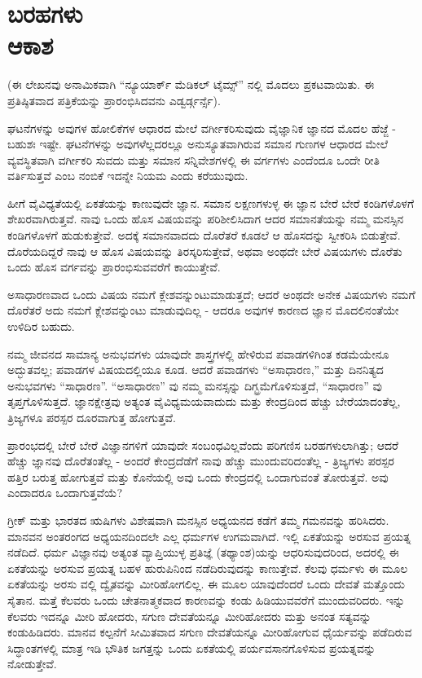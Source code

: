 
\chapter{ಬರಹಗಳು\\ಆಕಾಶ}

(ಈ ಲೇಖನವು ಅನಾಮಿಕವಾಗಿ “ನ್ಯೂಯಾರ್ಕ್ ಮೆಡಿಕಲ್ ಟೈಮ್ಸ್” ನಲ್ಲಿ ಮೊದಲು ಪ್ರಕಟವಾಯಿತು. ಈ ಪ್ರತಿಷ್ಠಿತವಾದ ಪತ್ರಿಕೆಯನ್ನು ಪ್ರಾರಂಭಿಸಿದವನು ಎಡ್ವರ್ಡ್ಗರ್ನ್ಸೆ).

ಘಟನೆಗಳನ್ನು ಅವುಗಳ ಹೋಲಿಕೆಗಳ ಆಧಾರದ ಮೇಲೆ ವರ್ಗೀಕರಿಸುವುದು ವೈಜ್ಞಾನಿಕ ಜ್ಞಾನದ ಮೊದಲ ಹೆಜ್ಜೆ - ಬಹುಶಃ ಇಷ್ಟೇ. ಘಟನೆಗಳನ್ನು ಅವುಗಳೆಲ್ಲದರಲ್ಲೂ ಅನುಸ್ಯೂತವಾಗಿರುವ ಸಮಾನ ಗುಣಗಳ ಆಧಾರದ ಮೇಲೆ ವ್ಯವಸ್ಥಿತವಾಗಿ ವರ್ಗೀಕರಿ ಸುವದು ಮತ್ತು ಸಮಾನ ಸನ್ನಿವೇಶಗಳಲ್ಲಿ ಈ ವರ್ಗಗಳು ಎಂದೆಂದೂ ಒಂದೇ ರೀತಿ ವರ್ತಿಸುತ್ತವೆ ಎಂಬ ನಂಬಿಕೆ ಇದನ್ನೇ ನಿಯಮ ಎಂದು ಕರೆಯುವುದು.

ಹೀಗೆ ವೈವಿಧ್ಯತೆಯಲ್ಲಿ ಏಕತೆಯನ್ನು ಕಾಣುವುದೇ ಜ್ಞಾನ. ಸಮಾನ ಲಕ್ಷಣಗಳುಳ್ಳ ಈ ಜ್ಞಾನ ಬೇರೆ ಬೇರೆ ಕಂಡಿಗಳೊಳಗೆ ಶೇಖರವಾಗಿರುತ್ತವೆ. ನಾವು ಒಂದು ಹೊಸ ವಿಷಯವನ್ನು ಪರಿಶೀಲಿಸಿದಾಗ ಆದರ ಸಮಾನತೆಯನ್ನು ನಮ್ಮ ಮನಸ್ಸಿನ ಕಂಡಿಗಳೊಳಗೆ ಹುಡುಕುತ್ತೇವೆ. ಅದಕ್ಕೆ ಸಮಾನವಾದದು ದೊರೆತರೆ ಕೂಡಲೆ ಆ ಹೊಸದನ್ನು ಸ್ವೀಕರಿಸಿ ಬಿಡುತ್ತೇವೆ. ದೊರೆಯದಿದ್ದರೆ ನಾವು ಆ ಹೊಸ ವಿಷಯವನ್ನು ತಿರಸ್ಕರಿಸುತ್ತೇವೆ, ಅಥವಾ ಅಂಥದೇ ಬೇರೆ ವಿಷಯಗಳು ದೊರೆತು ಒಂದು ಹೊಸ ವರ್ಗವನ್ನು ಪ್ರಾರಂಭಿಸುವವರೆಗೆ ಕಾಯುತ್ತೇವೆ.

ಅಸಾಧಾರಣವಾದ ಒಂದು ವಿಷಯ ನಮಗೆ ಕ್ಲೇಶವನ್ನುಂಟುಮಾಡುತ್ತದೆ; ಆದರೆ ಅಂಥದೇ ಅನೇಕ ವಿಷಯಗಳು ನಮಗೆ ದೊರೆತರೆ ಅದು ನಮಗೆ ಕ್ಲೇಶವನ್ನುಂಟು ಮಾಡುವುದಿಲ್ಲ - ಆದರೂ ಅವುಗಳ ಕಾರಣದ ಜ್ಞಾನ ಮೊದಲಿನಂತೆಯೇ ಉಳಿದಿರ ಬಹುದು.

ನಮ್ಮ ಜೀವನದ ಸಾಮಾನ್ಯ ಅನುಭವಗಳು ಯಾವುದೇ ಶಾಸ್ತ್ರಗಳಲ್ಲಿ ಹೇಳಿರುವ ಪವಾಡಗಳಿಗಿಂತ ಕಡಮೆಯೇನೂ ಅದ್ಭುತವಲ್ಲ; ಪವಾಡಗಳ ವಿಷಯದಲ್ಲಿಯೂ ಕೂಡ. ಆದರೆ ಪವಾಡಗಳು “ಅಸಾಧಾರಣ,” ಮತ್ತು ದಿನನಿತ್ಯದ ಅನುಭವಗಳು “ಸಾಧಾರಣ”. “ಅಸಾಧಾರಣ” ವು ನಮ್ಮ ಮನಸ್ಸನ್ನು ದಿಗ್ಭ್ರಮೆಗೊಳಿಸುತ್ತದೆ, “ಸಾಧಾರಣ” ವು ತೃಪ್ತಗೊಳಿಸುತ್ತದೆ. ಜ್ಞಾನಕ್ಷೇತ್ರವು ಅತ್ಯಂತ ವೈವಿಧ್ಯಮಯವಾದುದು ಮತ್ತು ಕೇಂದ್ರದಿಂದ ಹೆಚ್ಚು ಬೇರೆಯಾದಂತೆಲ್ಲ, ತ್ರಿಜ್ಯಗಳೂ ಪರಸ್ಪರ ದೂರವಾಗುತ್ತ ಹೋಗುತ್ತವೆ.

ಪ್ರಾರಂಭದಲ್ಲಿ ಬೇರೆ ಬೇರೆ ವಿಜ್ಞಾನಗಳಿಗೆ ಯಾವುದೇ ಸಂಬಂಧವಿಲ್ಲವೆಂದು ಪರಿಗಣಿಸ ಬರಹಗಳುಲಾಗಿತ್ತು; ಆದರೆ ಹೆಚ್ಚು ಜ್ಞಾನವು ದೊರೆತಂತೆಲ್ಲ - ಅಂದರೆ ಕೇಂದ್ರದೆಡೆಗೆ ನಾವು ಹೆಚ್ಚು ಮುಂದುವರಿದಂತೆಲ್ಲ - ತ್ರಿಜ್ಯಗಳು ಪರಸ್ಪರ ಹತ್ತಿರ ಬರುತ್ತ ಹೋಗುತ್ತವೆ ಮತ್ತು ಕೊನೆಯಲ್ಲಿ ಅವು ಒಂದು ಕೇಂದ್ರದಲ್ಲಿ ಒಂದಾಗುವಂತೆ ತೋರುತ್ತವೆ. ಅವು ಎಂದಾದರೂ ಒಂದಾಗುತ್ತವೆಯೆ?

ಗ್ರೀಕ್ ಮತ್ತು ಭಾರತದ ಋಷಿಗಳು ವಿಶೇಷವಾಗಿ ಮನಸ್ಸಿನ ಅಧ್ಯಯನದ ಕಡೆಗೆ ತಮ್ಮ ಗಮನವನ್ನು ಹರಿಸಿದರು. ಮಾನವನ ಅಂತರಂಗದ ಅಧ್ಯಯನದಿಂದಲೇ ಎಲ್ಲ ಧರ್ಮಗಳ ಉಗಮವಾಗಿದೆ. ಇಲ್ಲಿ ಏಕತೆಯನ್ನು ಅರಸುವ ಪ್ರಯತ್ನ ನಡೆದಿದೆ. ಧರ್ಮ ವಿಜ್ಞಾನವು ಅತ್ಯಂತ ವ್ಯಾಪ್ತಿಯುಳ್ಳ ಪ್ರತಿಜ್ಞೆ (ತಥ್ಯಾಂಶ)ಯನ್ನು ಆಧರಿಸುವುದರಿಂದ, ಅದರಲ್ಲಿ ಈ ಏಕತೆಯನ್ನು ಅರಸುವ ಪ್ರಯತ್ನ ಬಹಳ ಹುರುಪಿನಿಂದ ನಡೆದಿರುವುದನ್ನು ಕಾಣುತ್ತೇವೆ. ಕೆಲವು ಧರ್ಮಳು ಈ ಮೂಲ ಏಕತೆಯನ್ನು ಅರಸು ವಲ್ಲಿ ದ್ವೈತವನ್ನು ಮೀರಿಹೋಗಲಿಲ್ಲ. ಈ ಮೂಲ ಯಾವುದೆಂದರೆ ಒಂದು ದೇವತೆ ಮತ್ತೊಂದು ಸೈತಾನ. ಮತ್ತೆ ಕೆಲವರು ಒಂದು ಚೇತನಾತ್ಮಕವಾದ ಕಾರಣವನ್ನು ಕಂಡು ಹಿಡಿಯುವವರೆಗೆ ಮುಂದುವರಿದರು. ಇನ್ನು ಕೆಲವರು ಇದನ್ನೂ ಮೀರಿ ಹೋದರು, ಸಗುಣ ದೇವತೆಯನ್ನೂ ಮೀರಿಹೋದರು ಮತ್ತು ಅನಂತ ಸತ್ಯವನ್ನು ಕಂಡುಹಿಡಿದರು. ಮಾನವ ಕಲ್ಪನೆಗೆ ಸೀಮಿತವಾದ ಸಗುಣ ದೇವತೆಯನ್ನೂ ಮೀರಿಹೋಗುವ ಧೈರ್ಯವನ್ನು ಪಡೆದಿರುವ ಸಿದ್ಧಾಂತಗಳಲ್ಲಿ ಮಾತ್ರ ಇಡಿ ಭೌತಿಕ ಜಗತ್ತನ್ನು ಒಂದು ಏಕತೆಯಲ್ಲಿ ಪರ್ಯವಸಾನಗೊಳಿಸುವ ಪ್ರಯತ್ನವನ್ನು ನೋಡುತ್ತೇವೆ.

